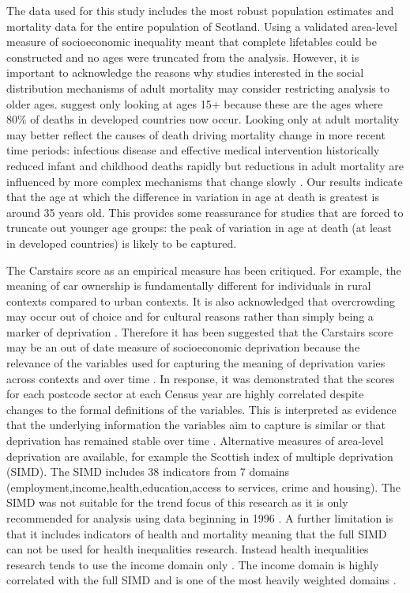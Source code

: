 \documentclass[12pt,oneside,a4paper]{article} %
\theoremstyle{definition}
\begin{document}
The data used for this study includes the most robust population estimates and mortality data for the entire population of Scotland. Using a validated area-level measure of socioeconomic inequality meant that complete lifetables could be constructed and no ages were truncated from the analysis. However, it is important to acknowledge the reasons why studies interested in the social distribution mechanisms of adult mortality may consider restricting analysis to older ages. \citet{Smits2009} suggest only looking at ages 15+ because these are the ages where 80\% of deaths in developed countries now occur. Looking only at adult mortality may better reflect the causes of death driving mortality change in more recent time periods: infectious disease and effective medical intervention historically reduced infant and childhood deaths rapidly but reductions in adult mortality are influenced by more complex mechanisms that change slowly \citep{Smits2009,Vallin2004}. Our results indicate that the age at which the difference in variation in age at death is greatest is around 35 years old. This provides some reassurance for studies that are forced to truncate out younger age groups: the peak of variation in age at death (at least in developed countries) is likely to be captured. 


The Carstairs score as an empirical measure has been critiqued. For example, the meaning of car ownership is fundamentally different for individuals in rural contexts compared to urban contexts. It is also acknowledged that overcrowding may occur out of choice and for cultural reasons rather than simply being a marker of deprivation \citep{Fischbacher2014}. Therefore it has been suggested that the Carstairs score may be an out of date measure of socioeconomic deprivation \citep{Schofield2016,Tunstall2011} because the relevance of the variables used for capturing the meaning of deprivation varies across contexts and over time \citep{Norman2010}. In response, it was demonstrated that the scores for each postcode sector at each Census year are highly correlated despite changes to the formal definitions of the variables. This is interpreted as evidence that the underlying information the variables aim to capture is similar or that deprivation has remained stable over time \citep{Leyland2007}. Alternative measures of area-level deprivation are available, for example the Scottish index of multiple deprivation (SIMD). The SIMD includes 38 indicators from 7 domains (employment,income,health,education,access to services, crime and housing). The SIMD was not suitable for the trend focus of this research as it is only recommended for analysis using data beginning in 1996 \citep{Health2017}. A further limitation is that it includes indicators of health and mortality meaning that the full SIMD can not be used for health inequalities research. Instead health inequalities research tends to use the income domain only \citep{Leyland2007a}. The income domain is highly correlated with the full SIMD and is one of the most heavily weighted domains \citep{Health2017,TheScottishGovernment2016}.   
\end{document}
